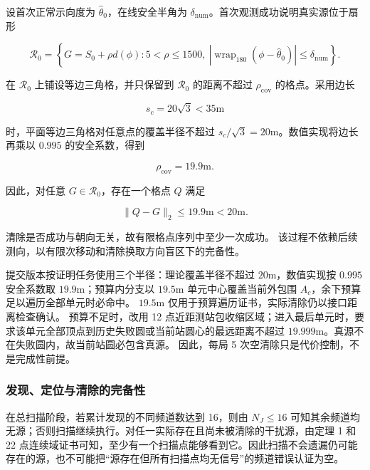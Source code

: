 设首次正常示向度为 $\hat\theta_0$，在线安全半角为 $\delta_{\mathrm{num}}$。首次观测成功说明真实源位于扇形

\begin{equation}
\mathcal R_0=
\left\{
G=S_0+\rho d(\phi):
5<\rho\le1500,\ 
\left|\operatorname{wrap}_{180}(\phi-\hat\theta_0)\right|
\le\delta_{\mathrm{num}}
\right\}.
\label{eq:q4_first_sector}
\end{equation}

在 $\mathcal R_0$ 上铺设等边三角格，并只保留到 $\mathcal R_0$ 的距离不超过 $\rho_{\mathrm{cov}}$ 的格点。采用边长

\begin{equation}
s_c=20\sqrt{3}<35\mathrm{m}
\label{eq:q4_clear_spacing}
\end{equation}

时，平面等边三角格对任意点的覆盖半径不超过 $s_c/\sqrt3=20\mathrm{m}$。数值实现将边长再乘以 $0.995$ 的安全系数，得到

\begin{equation}
\rho_{\mathrm{cov}}=19.9\mathrm{m}.
\label{eq:q4_clear_cover_radius}
\end{equation}

因此，对任意 $G\in\mathcal R_0$，存在一个格点 $Q$ 满足

\begin{equation}
\lVert Q-G\rVert_2\le19.9\mathrm{m}<20\mathrm{m}.
\label{eq:q4_clear_guarantee}
\end{equation}

清除是否成功与朝向无关，故有限格点序列中至少一次成功。
该过程不依赖后续测向，以有限次移动和清除换取方向盲区下的完备性。

提交版本按证明任务使用三个半径：理论覆盖半径不超过 $20\mathrm{m}$，数值实现按 $0.995$ 安全系数取 $19.9\mathrm{m}$；预算内分支以 $19.5\mathrm{m}$ 单元中心覆盖当前外包围 $A_c$，余下预算足以遍历全部单元时必命中。
$19.5\mathrm{m}$ 仅用于预算遍历证书，实际清除仍以接口距离检查确认。
预算不足时，改用 12 点近距测站包收缩区域；进入最后单元时，要求该单元全部顶点到历史失败圆或当前站圆心的最远距离不超过 $19.999\mathrm{m}$。真源不在失败圆内，故当前站圆必包含真源。
因此，每局 5 次空清除只是代价控制，不是完成性前提。

\subsubsection{发现、定位与清除的完备性}

在总扫描阶段，若累计发现的不同频道数达到 16，则由 $N_J\le16$ 可知其余频道均无源；否则扫描继续执行。对任一实际存在且尚未被清除的干扰源，由定理 1 和 22 点连续域证书可知，至少有一个扫描点能够看到它。因此扫描不会遗漏仍可能存在的源，也不可能把“源存在但所有扫描点均无信号”的频道错误认证为空。


